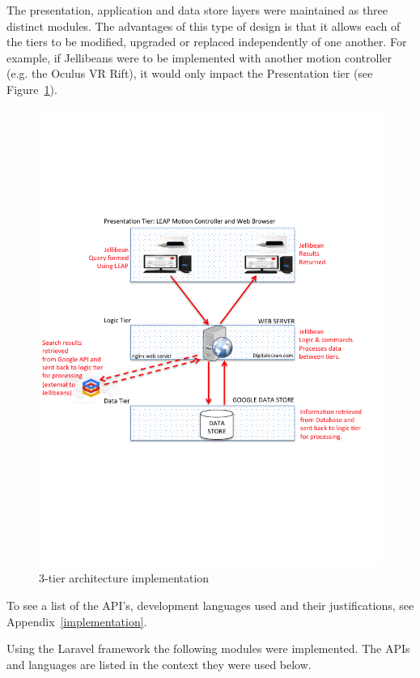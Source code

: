 \documentclass[a4paper, 11pt]{article}
\begin{document}
\vspace{5mm}
The presentation, application and data store layers were maintained as three distinct modules. The advantages of this type of design is that it allows each of the tiers to be modified, upgraded or replaced independently of one another. For example, if Jellibeans were to be implemented with another motion controller (e.g. the Oculus VR Rift), it would only impact the Presentation tier (see Figure~\ref{ntier}).
\begin{figure}[H]
\begin{center}
\includegraphics[scale=0.45]{ntier}
\caption{3-tier architecture implementation}
\label{ntier}
\end{center}
\end{figure}

To see a list of the API's, development languages used and their justifications, see Appendix~\ref{implementation}. 

\vspace{5mm}
Using the Laravel framework the following modules were implemented. The APIs and languages are listed in the context they were used below.\\
\end{document}
